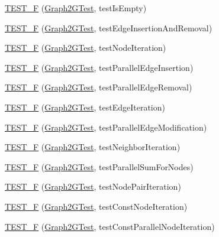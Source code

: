 \begin{DoxyCompactItemize}
\item 
\hyperlink{namespace_networ_kit_a5c7ec10a80327d1f725240dd250447cb}{T\-E\-S\-T\-\_\-\-F} (\hyperlink{class_networ_kit_1_1_graph2_g_test}{Graph2\-G\-Test}, test\-Is\-Empty)
\item 
\hyperlink{namespace_networ_kit_a15c2af1f595eb5507495a3d3a6cb88e5}{T\-E\-S\-T\-\_\-\-F} (\hyperlink{class_networ_kit_1_1_graph2_g_test}{Graph2\-G\-Test}, test\-Edge\-Insertion\-And\-Removal)
\item 
\hyperlink{namespace_networ_kit_a458b18e5bd29a405883b670653c58adf}{T\-E\-S\-T\-\_\-\-F} (\hyperlink{class_networ_kit_1_1_graph2_g_test}{Graph2\-G\-Test}, test\-Node\-Iteration)
\item 
\hyperlink{namespace_networ_kit_ae7ef375b8f21824ce2907632ac29f148}{T\-E\-S\-T\-\_\-\-F} (\hyperlink{class_networ_kit_1_1_graph2_g_test}{Graph2\-G\-Test}, test\-Parallel\-Edge\-Insertion)
\item 
\hyperlink{namespace_networ_kit_a19006853605ef30b2778f75a2f48f793}{T\-E\-S\-T\-\_\-\-F} (\hyperlink{class_networ_kit_1_1_graph2_g_test}{Graph2\-G\-Test}, test\-Parallel\-Edge\-Removal)
\item 
\hyperlink{namespace_networ_kit_a2b00c6ce31fcd9521d405be57e2a84b4}{T\-E\-S\-T\-\_\-\-F} (\hyperlink{class_networ_kit_1_1_graph2_g_test}{Graph2\-G\-Test}, test\-Edge\-Iteration)
\item 
\hyperlink{namespace_networ_kit_ae8d7cffd14e5535b61589346f8714ed5}{T\-E\-S\-T\-\_\-\-F} (\hyperlink{class_networ_kit_1_1_graph2_g_test}{Graph2\-G\-Test}, test\-Parallel\-Edge\-Modification)
\item 
\hyperlink{namespace_networ_kit_a9f010b0003464134e388a613a6caf8dc}{T\-E\-S\-T\-\_\-\-F} (\hyperlink{class_networ_kit_1_1_graph2_g_test}{Graph2\-G\-Test}, test\-Neighbor\-Iteration)
\item 
\hyperlink{namespace_networ_kit_a73dde806a3ef7c7f01dcb392932f4f9a}{T\-E\-S\-T\-\_\-\-F} (\hyperlink{class_networ_kit_1_1_graph2_g_test}{Graph2\-G\-Test}, test\-Parallel\-Sum\-For\-Nodes)
\item 
\hyperlink{namespace_networ_kit_a8b4f69971456ffcba5de0035d83f31da}{T\-E\-S\-T\-\_\-\-F} (\hyperlink{class_networ_kit_1_1_graph2_g_test}{Graph2\-G\-Test}, test\-Node\-Pair\-Iteration)
\item 
\hyperlink{namespace_networ_kit_a5aefb711bc65f7419de5569b2eb060d8}{T\-E\-S\-T\-\_\-\-F} (\hyperlink{class_networ_kit_1_1_graph2_g_test}{Graph2\-G\-Test}, test\-Const\-Node\-Iteration)
\item 
\hyperlink{namespace_networ_kit_a7879dfbbe86ba2a675a8a4d02d29ccdb}{T\-E\-S\-T\-\_\-\-F} (\hyperlink{class_networ_kit_1_1_graph2_g_test}{Graph2\-G\-Test}, test\-Const\-Parallel\-Node\-Iteration)

\end{DoxyCompactItemize}
